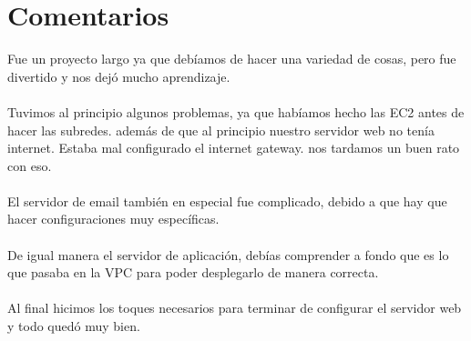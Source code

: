 \documentclass{report}
\begin{document}
\section{Comentarios}
Fue un proyecto largo ya que debíamos de hacer una variedad de cosas, pero fue divertido y nos dejó mucho aprendizaje. \\\\%
Tuvimos al principio algunos problemas, ya que habíamos hecho las EC2 antes de hacer las subredes. además de que al principio nuestro servidor web no tenía internet. Estaba mal configurado el internet gateway. nos tardamos un buen rato con eso.\\\\
El servidor de email también en especial fue complicado, debido a que hay que hacer configuraciones muy específicas.\\\\
De igual manera el servidor de aplicación, debías comprender a fondo que es lo que pasaba en la VPC para poder desplegarlo de manera correcta.\\\\
Al final hicimos los toques necesarios para terminar de configurar el servidor web y todo quedó muy bien.
\end{document}
